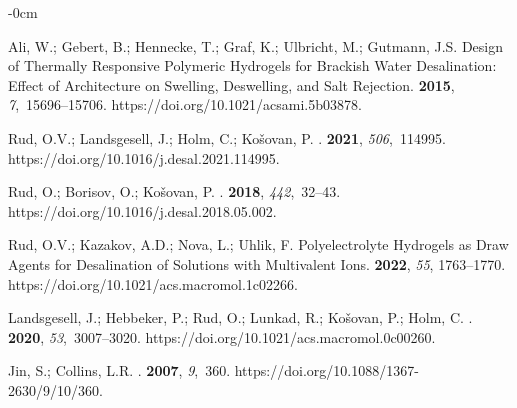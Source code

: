 \documentclass[gels,article,accept,pdftex,moreauthors]{Definitions/mdpi}
\begin{document}
\begin{adjustwidth}{-\extralength}{0cm}
\begin{thebibliography}{999}
Ali, W.; Gebert, B.; Hennecke, T.; Graf, K.; Ulbricht, M.; Gutmann, J.S.
\newblock Design of Thermally Responsive Polymeric Hydrogels for Brackish Water
  Desalination: Effect of Architecture on Swelling, Deswelling, and Salt
  Rejection.
  {\bf 2015}, {\em 7},~15696--15706.
\newblock
  https://doi.org/10.1021/acsami.5b03878.%

Rud, O.V.; Landsgesell, J.; Holm, C.; Ko{\v s}ovan, P.
.
 {\bf 2021}, {\em 506},~114995.
\newblock
  https://doi.org/10.1016/j.desal.2021.114995.%

Rud, O.; Borisov, O.; Ko{\v s}ovan, P.
.
 {\bf 2018}, {\em 442},~32--43.
\newblock
  https://doi.org/10.1016/j.desal.2018.05.002.%

Rud, O.V.; Kazakov, A.D.; Nova, L.; Uhlik, F.
\newblock Polyelectrolyte Hydrogels as Draw Agents for Desalination of
  Solutions with Multivalent Ions.
 {\bf 2022}, {\em 55}, 1763--1770.
\newblock
  https://doi.org/10.1021/acs.macromol.1c02266.%

Landsgesell, J.; Hebbeker, P.; Rud, O.; Lunkad, R.; Ko{\v s}ovan, P.; Holm, C.
.
 {\bf 2020}, {\em 53},~3007--3020.
\newblock
  https://doi.org/10.1021/acs.macromol.0c00260.%

Jin, S.; Collins, L.R.
.
 {\bf 2007}, {\em 9},~360.
\newblock
  https://doi.org/10.1088/1367-2630/9/10/360.%


\end{thebibliography}
\end{adjustwidth}
\end{document}
